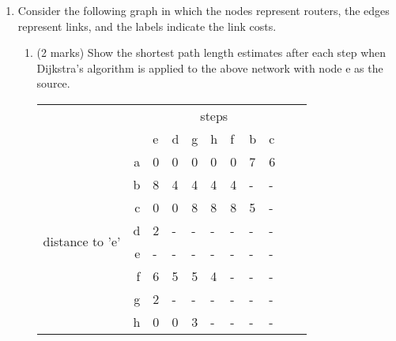 \documentclass[10pt]{amsart}
\begin{document}
\begin{enumerate}
    \item Consider the following graph in which the nodes represent routers, the
        edges represent links, and the labels indicate the link costs.
    \begin{enumerate}
        \item (2 marks) Show the shortest path length estimates after each step
            when Dijkstra’s algorithm is applied to the above network with node
            e as the source.\\
            \begin{tabular}{|lr|l|l|l|l|l|l|l|l|l|} \cline{3-9}
            \multicolumn{1}{l}{} && \multicolumn{7}{c|}{steps} \\ \cline{3-9}
            \multicolumn{1}{l}{} & & e & d & g & h & f & b & c \\ \hline
            \multirow{8}{*}{\begin{sideways}distance to 'e'\end{sideways}}
            & \multicolumn{1}{|r|}{a} & 0 & 0 & 0 & 0 & 0 & 7 & 6 \\ \cline{2-9}
            & \multicolumn{1}{|r|}{b} & 8 & 4 & 4 & 4 & 4 & - & - \\ \cline{2-9}
            & \multicolumn{1}{|r|}{c} & 0 & 0 & 8 & 8 & 8 & 5 & - \\ \cline{2-9}
            & \multicolumn{1}{|r|}{d} & 2 & - & - & - & - & - & - \\ \cline{2-9}
            & \multicolumn{1}{|r|}{e} & - & - & - & - & - & - & - \\ \cline{2-9}
            & \multicolumn{1}{|r|}{f} & 6 & 5 & 5 & 4 & - & - & - \\ \cline{2-9}
            & \multicolumn{1}{|r|}{g} & 2 & - & - & - & - & - & - \\ \cline{2-9}
            & \multicolumn{1}{|r|}{h} & 0 & 0 & 3 & - & - & - & - \\ \hline
            \end{tabular}


\end{enumerate}
\end{enumerate}
\end{document}
